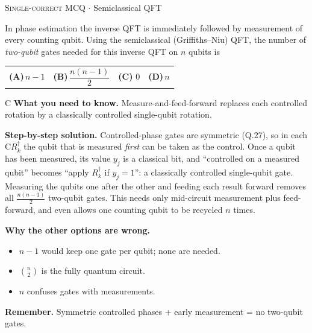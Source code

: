 \documentclass[11pt,a4paper]{article}
\newcommand{\optlabel}[1]{\textbf{(#1)}}
\newcommand{\correctlabel}[1]{\textcolor{okgreen}{\textbf{(#1)}\,\ding{51}}}
\newenvironment{qitem}[1]{\begin{list}{}{\setlength{\leftmargin}{3.3em}\setlength{\labelwidth}{3.1em}%
  \setlength{\labelsep}{0.2em}\setlength{\topsep}{3pt}\setlength{\parsep}{3pt}}\item[\textbf{Q.#1}\hfill]}{\end{list}}
\newcommand{\qsep}{\par\vspace{2pt}{\color{black!15}\hrule}\vspace{4pt}}
\newcommand{\qmeta}[2]{{\footnotesize\color{black!60}\textsc{#1} \;$\cdot$\; #2}\par}
\begin{document}
\begin{qitem}{74}
\qmeta{Single-correct MCQ}{Semiclassical QFT}
In phase estimation the inverse QFT is immediately followed by measurement of every counting qubit. Using the
semiclassical (Griffiths--Niu) QFT, the number of \emph{two-qubit} gates needed for this inverse QFT on $n$ qubits is
\par\smallskip\noindent\begin{tabularx}{\linewidth}{@{}*{4}{L}@{}}
\optlabel{A}\,$n - 1$ & \optlabel{B}\,$\dfrac{n(n-1)}{2}$ & \correctlabel{C}\,$0$ & \optlabel{D}\,$n$
\end{tabularx}
\end{qitem}
\begin{solbox}{C}
\textbf{\color{brand}What you need to know.} Measure-and-feed-forward replaces each controlled rotation by a classically controlled single-qubit rotation.

\textbf{\color{brand}Step-by-step solution.} Controlled-phase gates are symmetric (Q.27), so in each $\mathrm{C}R_k^\dagger$ the qubit that is measured \emph{first} can be
taken as the control. Once a qubit has been measured, its value $y_j$ is a classical bit, and ``controlled on a measured
qubit'' becomes ``apply $R_k^\dagger$ if $y_j = 1$'': a classically controlled single-qubit gate. Measuring the qubits one
after the other and feeding each result forward removes all $\frac{n(n-1)}{2}$ two-qubit gates. This needs only
mid-circuit measurement plus feed-forward, and even allows one counting qubit to be recycled $n$ times.

\textbf{\color{brand}Why the other options are wrong.}
\begin{itemize}[leftmargin=2.4em, itemsep=1pt, topsep=2pt]
\item[\textbf{(A)}] $n-1$ would keep one gate per qubit; none are needed.
\item[\textbf{(B)}] $\binom n2$ is the fully quantum circuit.
\item[\textbf{(D)}] $n$ confuses gates with measurements.
\end{itemize}
\textbf{\color{brand}Remember.} Symmetric controlled phases + early measurement = no two-qubit gates.
\end{solbox}
\qsep
\end{document}
